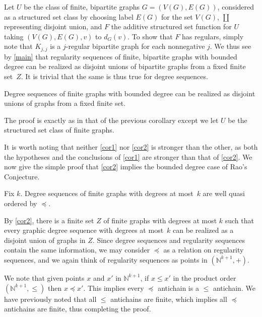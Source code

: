 \documentclass[review]{elsarticle}
\begin{document}
\begin{prf}
Let $U$ be the class of finite, bipartite graphs $G=(V(G),E(G))$,
considered as a structured set class by choosing label $E(G)$ for the
set $V(G)$,
$\coprod$ representing disjoint union,
and $F$ the additive structured set function for $U$
taking $(V(G),E(G),v)$ to $d_G(v)$.
To show that $F$ has regulars,
simply note that $K_{j,j}$ is a $j$-regular bipartite graph for
each nonnegative $j$. We thus see by \ref{main} that
regularity sequences of finite, bipartite graphs with bounded degree can be
realized as disjoint unions of bipartite graphs from a fixed finite set~$Z$.
It is trivial that the same is thus true for degree sequences.
\end{prf}

\begin{cor}\label{cor2}
Degree sequences of finite graphs with bounded degree can be
realized as disjoint unions of graphs from a fixed finite set.
\end{cor}

\begin{prf}
The proof is exactly as in that of the previous corollary except we let
$U$ be the structured set class of finite graphs.
\end{prf}

It is worth noting that neither \ref{cor1} nor \ref{cor2} is stronger
than the other, as both the hypotheses and the conclusions of \ref{cor1}
are stronger than that of \ref{cor2}. We now give the simple proof that
\ref{cor2} implies the bounded degree case of Rao's Conjecture.

\begin{cor}
Fix $k$. Degree sequences of finite graphs with degrees at most~$k$
are well quasi ordered by $\preceq$.
\end{cor}

\begin{prf}
By \ref{cor2}, there is a finite set $Z$ of finite graphs with degrees
at most $k$ such that every graphic degree sequence with degrees at
most~$k$ can be realized as a disjoint union of graphs in $Z$.
Since degree sequences and regularity sequences contain the same information,
we may consider $\preceq$ as a relation on regularity sequences, and we
again think of regularity sequences as points in $(\mathbb{N}^{k+1},+)$.

We note that given points $x$ and $x'$ in $\mathbb{N}^{k+1}$, if
$x\le x'$ in the product order $(\mathbb{N}^{k+1},\le)$ then
$x\preceq x'$. This implies every $\preceq$ antichain is a $\le$
antichain. We have previously noted that all $\le$ antichains are
finite, which implies all $\preceq$ antichains are finite, thus
completing the proof.
\end{prf}




\end{document}
